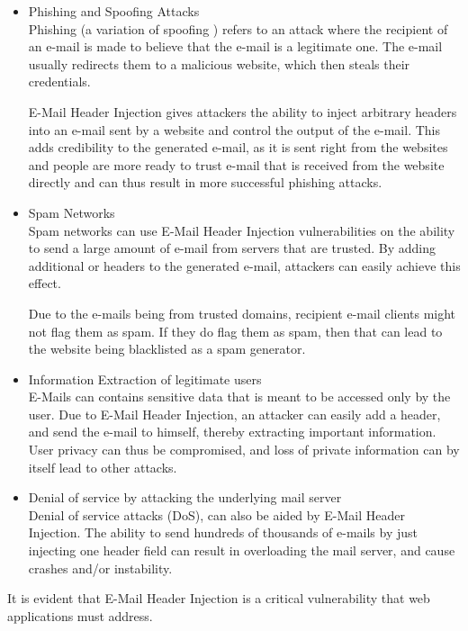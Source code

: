 \begin{itemize}
	\item Phishing and Spoofing Attacks\\
    Phishing \cite{wiki:Phishing} (a variation of spoofing \cite{wiki:Spoofing_attack}) refers to an attack where the recipient of an e-mail is made to believe that the e-mail is a legitimate one. The e-mail usually redirects them to a malicious website, which then steals their credentials. 
    
    E-Mail Header Injection gives attackers the ability to inject arbitrary headers into an e-mail sent by a website and control the output of the e-mail. This adds credibility to the generated e-mail, as it is sent right from the websites and people are more ready to trust e-mail that is received from the website directly and can thus result in more successful phishing attacks.
	
	\item Spam Networks\\
	Spam networks can use E-Mail Header Injection vulnerabilities on the ability to send a large amount of e-mail from servers that are trusted. By adding additional  or  headers to the generated e-mail, attackers can easily achieve this effect. 
	
	Due to the e-mails being from trusted domains, recipient e-mail clients might not flag them as spam. If they do flag them as spam, then that can lead to the website being blacklisted as a spam generator. 
	
	\item Information Extraction of legitimate users\\
	E-Mails can contains sensitive data that is meant to be accessed only by the user. Due to E-Mail Header Injection, an attacker can easily add a  header, and send the e-mail to himself, thereby extracting important information.
	User privacy can thus be compromised, and loss of private information can by itself lead to other attacks.
	
	\item Denial of service by attacking the underlying mail server\\
    Denial of service attacks (DoS), can also be aided by E-Mail Header Injection. The ability to send hundreds of thousands of e-mails by just injecting one header field can result in overloading the mail server, and cause crashes and/or instability. 
\end{itemize}

It is evident that E-Mail Header Injection is a critical vulnerability that web applications must address.